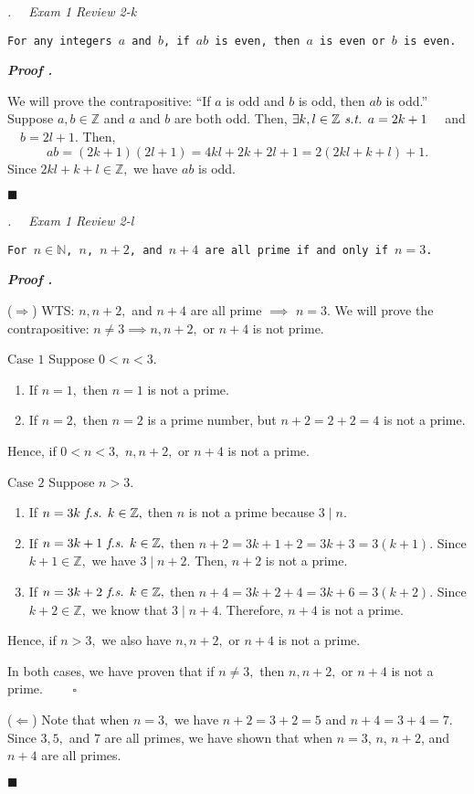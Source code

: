 \documentclass[11pt,letter]{article}
\newcounter{nq}[section]
\newcounter{np}[section]
\newenvironment*{p}{\par\noindent\textbf{\textit{Proof \stepcounter{np}\thenp. }}\par}{\par\hfill $\blacksquare$\par}
\newenvironment*{q}[1]{\noindent\emph{\thesection.\stepcounter{nq}\thenq$\quad $ #1}\par\noindent\texttt}{}
\def\Z{{\mathbb{Z}}}
\def\N{{\mathbb{N}}}
\def\st{\emph{ s.t. }}
\def\fs{\emph{ f.s. }}
\begin{document}
\begin{framed}\begin{q}
	{Exam 1 Review 2-k}
	{For any integers $a$ and $b$, if $ab$ is even, then $a$ is even or $b$ is even.}
\end{q}\end{framed}
\begin{p}
	We will prove the contrapositive: ``If $a$ is odd and $b$ is odd, then $ab$ is odd.'' Suppose $a,b\in\Z$ and $a$ and $b$ are both odd. Then, $\exists k,l\in\Z\st a=2k+1\quad$ and $\quad b=2l+1.$ Then, \[ab=(2k+1)(2l+1)=4kl+2k+2l+1=2(2kl+k+l)+1.\] Since $2kl+k+l\in\Z,$ we have $ab$ is odd.
\end{p}

\begin{framed}\begin{q}
	{Exam 1 Review 2-l}
	{For $n\in\N$, $n$, $n+2$, and $n+4$ are all prime if and only if $n=3$.}
\end{q}\end{framed}
\begin{p}
	($\Rightarrow$) WTS: $n, n+2,$ and $n+4$ are all prime $\implies$ $n=3.$ We will prove the contrapositive: $n\neq3\implies n, n+2,$ or $n+4$ is not prime.\par 
		$\boxed{\text{Case }1}$ Suppose $0<n<3.$ 
			\begin{enumerate}
				\item[\ding{172}] If $n=1,$ then $n=1$ is not a prime.
				\item[\ding{173}] If $n=2,$ then $n=2$ is a prime number, but $n+2=2+2=4$ is not a prime.
			\end{enumerate}
			Hence, if $0<n<3,$ $n, n+2,$ or $n+4$ is not a prime.\par 
		$\boxed{\text{Case 2}}$ Suppose $n>3.$
		\begin{enumerate}
				\item[\ding{172}] If $n=3k\fs k\in\Z,$ then $n$ is not a prime because $3\mid n$.
				\item[\ding{173}] If $n=3k+1\fs k\in\Z,$ then $n+2=3k+1+2=3k+3=3(k+1).$ Since $k+1\in\Z,$ we have $3\mid n+2.$ Then, $n+2$ is not a prime.
				\item[\ding{174}] If $n=3k+2\fs k\in\Z,$ then $n+4=3k+2+4=3k+6=3(k+2).$ Since $k+2\in\Z,$ we know that $3\mid n+4.$ Therefore, $n+4$ is not a prime.
			\end{enumerate}
			Hence, if $n>3,$ we also have $n, n+2,$ or $n+4$ is not a prime.\par 
		In both cases, we have proven that if $n\neq3,$ then $n, n+2,$ or $n+4$ is not a prime. $\qquad\square$\par 
	($\Leftarrow$) Note that when $n=3,$ we have $n+2=3+2=5$ and $n+4=3+4=7.$ Since $3, 5,$ and $7$ are all primes, we have shown that when $n=3$, $n$, $n+2$, and $n+4$ are all primes.
\end{p}
\end{document}
